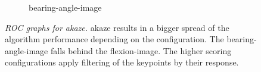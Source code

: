 \begin{figure}[H]
\begin{subfigure}[t]{0.45\linewidth}
    \caption{\gls{bearing-angle-image}}
\end{subfigure}
    \caption[\acrshort{ROC} graphs for \acrshort{akaze}]{\emph{\acrshort{ROC} graphs for \acrshort{akaze}.} \acrshort{akaze} results in a bigger spread of the algorithm performance depending on the configuration. The \gls{bearing-angle-image} falls behind the \gls{flexion-image}. The higher scoring configurations apply filtering of the keypoints by their response.}\label{fig:roc_akaze}
\end{figure}
